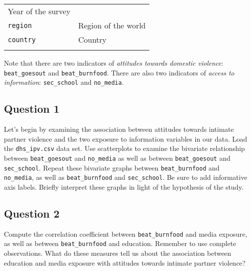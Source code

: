 \documentclass[]{article}
\begin{document}
\begin{longtable}[c]{@{}ll@{}}
\begin{minipage}[t]{0.72\columnwidth}
Year of the survey
\end{minipage}
\\\addlinespace
\begin{minipage}[t]{0.22\columnwidth}\raggedright
\texttt{region}
\end{minipage} & \begin{minipage}[t]{0.72\columnwidth}\raggedright
Region of the world
\end{minipage}
\\\addlinespace
\begin{minipage}[t]{0.22\columnwidth}\raggedright
\texttt{country}
\end{minipage} & \begin{minipage}[t]{0.72\columnwidth}\raggedright
Country
\end{minipage}
\\\addlinespace
\bottomrule
\end{longtable}

Note that there are two indicators of \emph{attitudes towards domestic
violence}: \texttt{beat\_goesout} and \texttt{beat\_burnfood}. There are
also two indicators of \emph{access to information}:
\texttt{sec\_school} and \texttt{no\_media}.

\subsection{Question 1}\label{question-1}

Let's begin by examining the association between attitudes towards
intimate partner violence and the two exposure to information variables
in our data. Load the \texttt{dhs\_ipv.csv} data set. Use scatterplots
to examine the bivariate relationship between \texttt{beat\_goesout} and
\texttt{no\_media} as well as between \texttt{beat\_goesout} and
\texttt{sec\_school}. Repeat these bivariate graphs between
\texttt{beat\_burnfood} and \texttt{no\_media}, as well as
\texttt{beat\_burnfood} and \texttt{sec\_school}. Be sure to add
informative axis labels. Briefly interpret these graphs in light of the
hypothesis of the study.

\subsection{Question 2}\label{question-2}

Compute the correlation coefficient between \texttt{beat\_burnfood} and
media exposure, as well as between \texttt{beat\_burnfood} and
education. Remember to use complete observations. What do these measures
tell us about the association between education and media exposure with
attitudes towards intimate partner violence?
\end{document}
